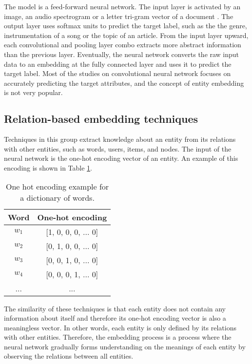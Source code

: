 \documentclass[conference]{IEEEtran}
\begin{document}
The model is a feed-forward neural network.
The input layer is activated by
an image,
an audio spectrogram \cite{van2013deep} or
a letter tri-gram vector of a document \cite{elkahky2015multi}.
The output layer uses softmax units to predict the target label,
such as the the genre, instrumentation of a song or the topic of an article.
From the input layer upward,
each convolutional and pooling layer combo extracts more abstract information
than the previous layer.
Eventually, the neural network converts the raw input data to an embedding
at the fully connected layer and uses it to predict the target label.
Most of the studies on convolutional neural network focuses on accurately
predicting the target attributes,
and the concept of entity embedding is not very popular.

\subsection{Relation-based embedding techniques}
Techniques in this group extract knowledge about an entity from its relations 
with other entities, such as words, users, items, and nodes.
The input of the neural network is the one-hot encoding vector of an entity.
An example of this encoding is shown in Table \ref{tab:one-hot}.
\begin{table}[!ht]
	\centering
	\caption{One hot encoding example for a dictionary of words.}
	\begin{tabular}{cc} \hline
		Word & One-hot encoding \\ \hline
		$ w_1 $ & [1, 0, 0, 0, ... 0]       \\ \hline
		$ w_2 $ & [0, 1, 0, 0, ... 0]       \\ \hline
		$ w_3 $ & [0, 0, 1, 0, ... 0]       \\ \hline
		$ w_4 $ & [0, 0, 0, 1, ... 0]       \\ \hline
		... & ...       \\ \hline
	\end{tabular}
	\label{tab:one-hot}
\end{table}
The similarity of these techniques is that each entity does not contain any
information about itself and therefore its one-hot encoding vector is also
a meaningless vector.
In other words, each entity is only defined by its relations with other entities.
Therefore, the embedding process is a process where the neural network gradually
forms understanding on the meanings of each entity by observing the relations
between all entities.
\end{document}
